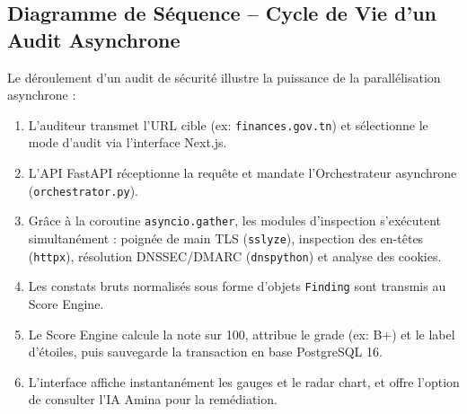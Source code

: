 \subsection{Diagramme de Séquence -- Cycle de Vie d'un Audit Asynchrone}
Le déroulement d'un audit de sécurité illustre la puissance de la parallélisation asynchrone :
\begin{enumerate}
    \item L'auditeur transmet l'URL cible (ex: \texttt{finances.gov.tn}) et sélectionne le mode d'audit via l'interface Next.js.
    \item L'API FastAPI réceptionne la requête et mandate l'Orchestrateur asynchrone (\texttt{orchestrator.py}).
    \item Grâce à la coroutine \texttt{asyncio.gather}, les modules d'inspection s'exécutent simultanément : poignée de main TLS (\texttt{sslyze}), inspection des en-têtes (\texttt{httpx}), résolution DNSSEC/DMARC (\texttt{dnspython}) et analyse des cookies.
    \item Les constats bruts normalisés sous forme d'objets \texttt{Finding} sont transmis au Score Engine.
    \item Le Score Engine calcule la note sur 100, attribue le grade (ex: B+) et le label d'étoiles, puis sauvegarde la transaction en base PostgreSQL 16.
    \item L'interface affiche instantanément les gauges et le radar chart, et offre l'option de consulter l'IA Amina pour la remédiation.
\end{enumerate}
